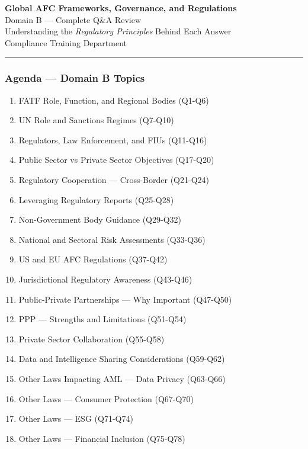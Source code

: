 \documentclass[12pt,aspectratio=169]{beamer}
\renewcommand{\scriptsize}{\fontsize{5}{6}\selectfont}
\begin{document}
	
	\begin{frame}
		\centering
		\vspace{0.8cm}
		{\fontsize{16}{19}\selectfont \textbf{Global AFC Frameworks, Governance, and Regulations}}\\[0.15cm]
		{\fontsize{12}{14}\selectfont Domain B — Complete Q\&A Review}\\[0.3cm]
		{\fontsize{9}{11}\selectfont Understanding the \textit{Regulatory Principles} Behind Each Answer}\\[0.3cm]
		{\fontsize{8}{10}\selectfont Compliance Training Department}
		\vspace{0.2cm}
		\rule{4cm}{0.5pt}
	\end{frame}
	
	\begin{frame}
		\frametitle{\fontsize{11}{13}\selectfont Agenda — Domain B Topics}
		\scriptsize
		\begin{enumerate}
			\item FATF Role, Function, and Regional Bodies (Q1-Q6)
			\item UN Role and Sanctions Regimes (Q7-Q10)
			\item Regulators, Law Enforcement, and FIUs (Q11-Q16)
			\item Public Sector vs Private Sector Objectives (Q17-Q20)
			\item Regulatory Cooperation — Cross-Border (Q21-Q24)
			\item Leveraging Regulatory Reports (Q25-Q28)
			\item Non-Government Body Guidance (Q29-Q32)
			\item National and Sectoral Risk Assessments (Q33-Q36)
			\item US and EU AFC Regulations (Q37-Q42)
			\item Jurisdictional Regulatory Awareness (Q43-Q46)
			\item Public-Private Partnerships — Why Important (Q47-Q50)
			\item PPP — Strengths and Limitations (Q51-Q54)
			\item Private Sector Collaboration (Q55-Q58)
			\item Data and Intelligence Sharing Considerations (Q59-Q62)
			\item Other Laws Impacting AML — Data Privacy (Q63-Q66)
			\item Other Laws — Consumer Protection (Q67-Q70)
			\item Other Laws — ESG (Q71-Q74)
			\item Other Laws — Financial Inclusion (Q75-Q78)
		\end{enumerate}
	\end{frame}
	
\end{document}
